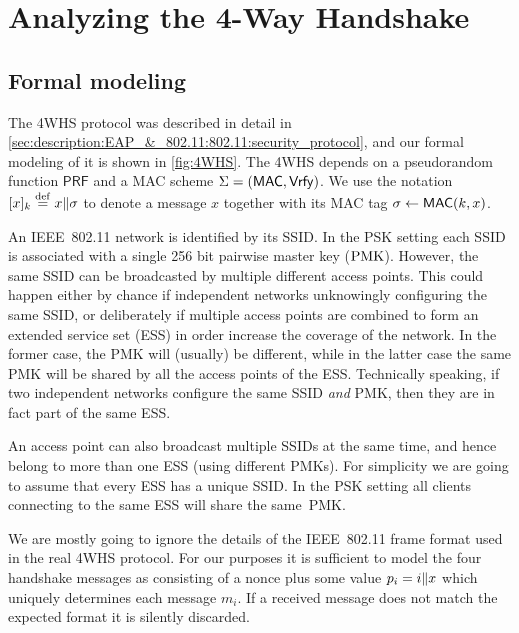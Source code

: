 \section{Analyzing the 4-Way Handshake}\label{sec:802.11:4WHS}



\subsection{Formal modeling}

The 4WHS protocol was described in detail in \cref{sec:description:EAP_&_802.11:802.11:security_protocol},
and our formal modeling of it is shown in \cref{fig:4WHS}.
The 4WHS depends on a pseudorandom function $\mathsf{PRF}$ and a MAC scheme $\Sigma = (\mathsf{MAC}, \mathsf{Vrfy})$.
We use the notation $[x]_k \overset{\mathrm{def}}{=} x \| \sigma$ to denote a message $x$ together with its MAC tag $\sigma \gets \mathsf{MAC}(k,x)$.


An IEEE~802.11 network is identified by its SSID.
In the PSK setting each SSID is associated with a single 256 bit pairwise master key ($\mathrm{PMK}$).
However,
the same SSID can be broadcasted by multiple different access points.
This could happen either by chance if independent networks unknowingly configuring the same SSID,
or deliberately if multiple access points are combined to form an extended service set (ESS) in order increase the coverage of the network.
In the former case,
the PMK will (usually) be different,
while in the latter case the same PMK will be shared by all the access points of the ESS.
Technically speaking,
if two independent networks configure the same SSID \emph{and} PMK,
then they are in fact part of the same ESS.


An access point can also broadcast multiple SSIDs at the same time,
and hence belong to more than one ESS
(using different PMKs).
For simplicity we are going to assume that every ESS has a unique SSID.
In the PSK setting all clients connecting to the same ESS will share the same~PMK.
 

We are mostly going to ignore the details of the IEEE~802.11 frame format used in the real 4WHS protocol.
For our purposes it is sufficient to model the four handshake messages as consisting of a nonce plus some value $p_i = i \| x$ which uniquely determines each message $m_i$.
If a received message does not match the expected format it is silently discarded.

